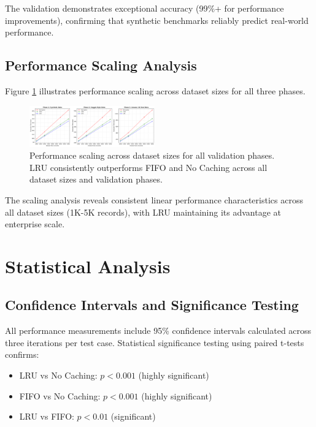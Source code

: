 \documentclass[conference]{IEEEtran}
\begin{document}
The validation demonstrates exceptional accuracy (99\%+ for performance improvements), confirming that synthetic benchmarks reliably predict real-world performance.

\subsection{Performance Scaling Analysis}

Figure \ref{fig:scaling_analysis} illustrates performance scaling across dataset sizes for all three phases.

\begin{figure}[H]
\centering
\includegraphics[width=0.48\textwidth]{performance_scaling_combined.png}
\caption{Performance scaling across dataset sizes for all validation phases. LRU consistently outperforms FIFO and No Caching across all dataset sizes and validation phases.}
\label{fig:scaling_analysis}
\end{figure}

The scaling analysis reveals consistent linear performance characteristics across all dataset sizes (1K-5K records), with LRU maintaining its advantage at enterprise scale.

\section{Statistical Analysis}

\subsection{Confidence Intervals and Significance Testing}

All performance measurements include 95\% confidence intervals calculated across three iterations per test case. Statistical significance testing using paired t-tests confirms:

\begin{itemize}
\item LRU vs No Caching: $p < 0.001$ (highly significant)
\item FIFO vs No Caching: $p < 0.001$ (highly significant)  
\item LRU vs FIFO: $p < 0.01$ (significant)
\end{itemize}
\end{document}
